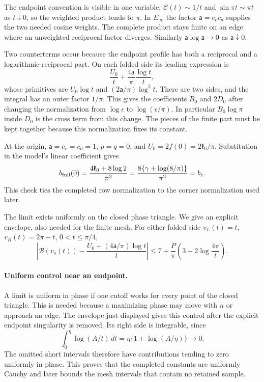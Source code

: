 The endpoint convention is visible in one variable:
$\mathcal C(t)\sim1/t$ and $\sin\pi t\sim\pi t$ as $t\downarrow0$,
so the weighted product tends to $\pi$. In $E_\infty$ the factor
$\mathsf{a}=c_ec_d$ supplies the two needed cosine weights. The complete
product stays finite on an edge where an unweighted reciprocal factor
diverges. Similarly $\mathsf{a}\log \mathsf{a}\to0$ as $\mathsf{a}\downarrow0$.

Two counterterms occur because the endpoint profile has both a
reciprocal and a logarithmic-reciprocal part. On each folded side its
leading expression is
\[
 \frac{U_0}{t}+\frac{4\mathsf{a}}{\pi}\frac{\log t}{t},
\]
whose primitives are $U_0\log t$ and $(2\mathsf{a}/\pi)\log^2t$.
There are two sides, and the integral has an outer factor $1/\pi$.
This gives the coefficients $B_0$ and $2D_0$ after changing the
normalization from $\log\epsilon$ to $\log(\epsilon/\pi)$.
In particular $B_0\log\pi$ inside $D_0$ is the cross term from
this change. The pieces of the finite part must be kept together
because this normalization fixes its constant.

At the origin, $\mathsf{a}=c_e=c_d=1$, $p=q=0$, and
$U_0=2f(0)=2\mathfrak{k}_0/\pi$. Substitution in the model's linear coefficient
gives
\[
 b_{\rm full}(0)=\frac{4\mathfrak{k}_0+8\log2}{\pi^2}
 =\frac{8\{\gamma+\log(8/\pi)\}}{\pi^2}=b_c.
\]
This check ties the completed row normalization to the corner
normalization used later.

The limit exists uniformly on the closed phase triangle. We give an
explicit envelope, also needed for the finite mesh. For either folded
side $v_L(t)=t$, $v_R(t)=2\pi-t$, $0<t\leq\pi/4$,
\begin{equation}\label{uc:endpoint-envelope}
 \left|\mathcal B(v_s(t))-
       \frac{U_0+(4\mathsf{a}/\pi)\log t}{t}\right|
 \leq7+\frac P\pi\left(3+2\log\frac{4\pi}{t}\right).
\end{equation}
\paragraph{Uniform control near an endpoint.}
A limit is uniform in phase if one cutoff works for every point of
the closed triangle. This is needed because a maximizing phase may
move with $n$ or approach an edge. The envelope just displayed gives
this control after the explicit endpoint singularity is removed. Its
right side is integrable, since
\[
 \int_0^\eta\log(A/t)\,dt=\eta\{1+\log(A/\eta)\}\longrightarrow0.
\]
The omitted short intervals therefore have contributions tending to
zero uniformly in phase. This proves that the completed constants
are uniformly Cauchy and later bounds the mesh intervals that contain
no retained sample.

